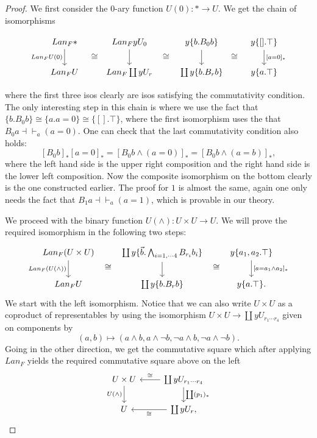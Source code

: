 \documentclass[a4paper]{amsproc}
\theoremstyle{plain}
\theoremstyle{definition}
\theoremstyle{remark}
\numberwithin{equation}{section}
\begin{document}
\begin{proof}
We first consider the 0-ary function $U(0): * \to U$. We get the chain of isomorphisms

\[
\begin{tikzcd}
Lan_F * \arrow[d, "Lan_F U(0)"'] \arrow[r, "\cong"',phantom, shift right=7] & Lan_F y U_0 \arrow[d] \arrow[r, "\cong"',phantom, shift right=7] & y \{b . B_0 b \} \arrow[d] \arrow[r, "\cong"',phantom, shift right=7] & {y \{[].\top\}} \arrow[d, "{[a=0]_*}"] \\
Lan_F U                                                             & Lan_F \coprod y U_r                                      & \coprod y \{ b . B_r b\}                                      & y\{a.\top\}                         
\end{tikzcd}
\]

where the first three isos clearly are isos satisfying the commutativity condition. The only interesting step in this chain is where we use the fact that $\{b . B_0 b\} \cong \{a . a = 0\} \cong \{[]. \top\}$, where the first isomorphism uses the that $B_0 a \dashv \vdash_a (a = 0)$. One can check that the last commutativity condition also holds:
\[
[B_0 b]_* [a=0]_* = [B_0 b \wedge (a = 0)]_* = [B_0 b \wedge (a=b)]_*,
\]
where the left hand side is the upper right composition and the right hand side is the lower left composition. Now the composite isomorphism on the bottom clearly is the one constructed earlier. The proof for $1$ is almost the same, again one only needs the fact that $B_1 a \dashv \vdash_a (a = 1)$, which is provable in our theory.

We proceed with the binary function $U(\wedge): U \times U \to U$. We will prove the required isomorphism in the following two steps:
\[
\begin{tikzcd}
Lan_F(U \times U) \arrow[d, "Lan_F(U(\wedge))"'] \arrow[r, phantom, shift right=7, "\cong"] & {\coprod y \{\vec{b}.\bigwedge_{i=1,\cdots 4} B_{r_i} b_i\}} \arrow[d] \arrow[r, phantom, shift right=7, "\cong"] & {y \{a_1,a_2.\top\}} \arrow[d, "{[a = a_1 \wedge a_2]_*}"] \\
Lan_F U                                          & \coprod y \{b.B_rb\} & y\{a.\top\} .
\end{tikzcd}
\]
We start with the left isomorphism. Notice that we can also write $U \times U$ as a coproduct of representables by using the isomorphism $U \times U \to \coprod y U_{r_1 \cdots r_4}$ given on components by 
\[
(a,b) \mapsto (a \wedge b, a \wedge \neg b, \neg a \wedge b, \neg a \wedge \neg b) .
\]
Going in the other direction, we get the commutative square which after applying $Lan_F$ yields the required commutative square above on the left
\[
\begin{tikzcd}
U \times U \arrow[d, "U(\wedge)"'] & \coprod y U_{r_1 \cdots r_4} \arrow[d, "\coprod (p_1)_*"] \arrow[l, "\cong"'] \\
U                                  & \coprod y U_r \arrow[l, "\cong"]                          ,
\end{tikzcd}
\]


\end{proof}
\end{document}

